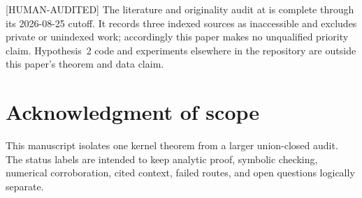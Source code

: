 \documentclass[11pt]{article}
\theoremstyle{plain}
\theoremstyle{definition}
\theoremstyle{remark}
\newcommand{\status}[1]{\textnormal{\textsf{\footnotesize[#1]}}}
\newcommand{\HumanAudited}{\status{HUMAN-AUDITED}}
\begin{document}
\HumanAudited{} The literature and originality audit at
 is complete through its 2026-08-25 cutoff.
It records three indexed sources as inaccessible and excludes private or
unindexed work; accordingly this paper makes no unqualified priority claim.
Hypothesis~2 code and experiments elsewhere in the repository are outside this
paper's theorem and data claim.

\section*{Acknowledgment of scope}
This manuscript isolates one kernel theorem from a larger union-closed audit.
The status labels are intended to keep analytic proof, symbolic checking,
numerical corroboration, cited context, failed routes, and open questions
logically separate.



\end{document}
